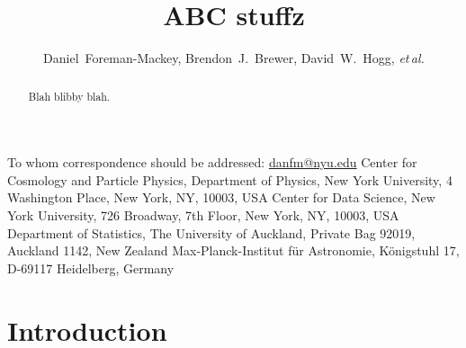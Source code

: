 \documentclass[12pt,preprint]{aastex}
\newcommand{\foreign}[1]{\emph{#1}}
\newcommand{\etal}{\foreign{et\,al.}}
\begin{document}
\title{%
    ABC stuffz
}

\newcommand{\nyu}{2}
\newcommand{\cds}{3}
\newcommand{\auck}{4}
\newcommand{\mpia}{5}
\author{%
    Daniel~Foreman-Mackey\altaffilmark{1,\nyu,\cds},
    Brendon~J.~Brewer\altaffilmark{\auck},
    David~W.~Hogg\altaffilmark{\nyu,\mpia,\cds},
    \etal
}
         {To whom correspondence should be addressed:
                          \url{danfm@nyu.edu}}
\altaffiltext{\nyu}      {Center for Cosmology and Particle Physics,
                          Department of Physics, New York University,
                          4 Washington Place, New York, NY, 10003, USA}
\altaffiltext{\cds}      {Center for Data Science, New York University,
                          726 Broadway, 7th Floor, New York, NY, 10003, USA}
\altaffiltext{\auck}     {Department of Statistics,
                          The University of Auckland, Private Bag 92019,
                          Auckland 1142, New Zealand}
\altaffiltext{\mpia}     {Max-Planck-Institut f\"ur Astronomie,
                          K\"onigstuhl 17, D-69117 Heidelberg, Germany}

\begin{abstract}

Blah blibby blah.

\end{abstract}


\section{Introduction}
\end{document}
